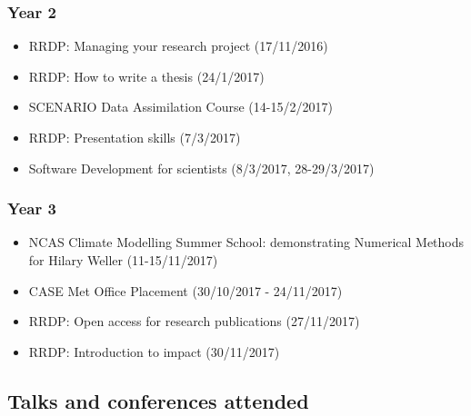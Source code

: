 \documentclass[11pt,a4paper]{article}
\begin{document}
\subsubsection*{Year 2}

\begin{itemize}
  \item RRDP: Managing your research project (17/11/2016)
  \item RRDP: How to write a thesis (24/1/2017)
  \item SCENARIO Data Assimilation Course (14-15/2/2017)
  \item RRDP: Presentation skills (7/3/2017)
  \item Software Development for scientists (8/3/2017, 28-29/3/2017)
\end{itemize}

\subsubsection*{Year 3}

\begin{itemize}
  \item NCAS Climate Modelling Summer School: demonstrating Numerical Methods for Hilary Weller (11-15/11/2017)
  \item CASE Met Office Placement (30/10/2017 - 24/11/2017)
  \item RRDP: Open access for research publications (27/11/2017)
  \item RRDP: Introduction to impact (30/11/2017)
\end{itemize}

\subsection*{Talks and conferences attended}
\end{document}
